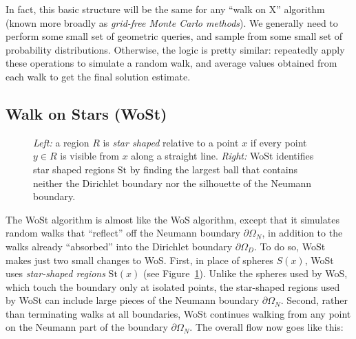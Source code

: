 \documentclass{article}
\newcommand{\figloc}[1]{\textit{#1}}
\newcommand{\St}{\text{St}}
\renewcommand{\vec}[1]{#1}
\begin{document}
In fact, this basic structure will be the same for any ``walk on X'' algorithm (known more broadly as \emph{grid-free Monte Carlo methods}).  We generally need to perform some small set of geometric queries, and sample from some small set of probability distributions.  Otherwise, the logic is pretty similar: repeatedly apply these operations to simulate a random walk, and average values obtained from each walk to get the final solution estimate.

\subsection{Walk on Stars (WoSt)}
\label{sec:WalkOnStarsOverview}

\begin{figure}[h!]
   \centering
   
   

   \caption{\figloc{Left:} a region \(R\) is \emph{star shaped} relative to a point \(\vec{x}\) if every point \(\vec{y} \in R\) is visible from \(\vec{x}\) along a straight line. \figloc{Right:} WoSt identifies star shaped regions \(\St\) by finding the largest ball that contains neither the Dirichlet boundary nor the silhouette of the Neumann boundary.\label{fig:StarShapedRegions}}
\end{figure}

The WoSt algorithm is almost like the WoS algorithm, except that it simulates random walks that ``reflect'' off the Neumann boundary \(\partial\Omega_N\), in addition to the walks already ``absorbed'' into the Dirichlet boundary \(\partial\Omega_D\).  To do so, WoSt makes just two small changes to WoS.  First, in place of spheres \(S(\vec{x})\), WoSt uses \emph{star-shaped regions} \(\St(\vec{x})\) (see Figure~\ref{fig:StarShapedRegions}).  Unlike the spheres used by WoS, which touch the boundary only at isolated points, the star-shaped regions used by WoSt can include large pieces of the Neumann boundary \(\partial\Omega_N\).  Second, rather than terminating walks at all boundaries, WoSt continues walking from any point on the Neumann part of the boundary \(\partial\Omega_N\).  The overall flow now goes like this:
\end{document}
